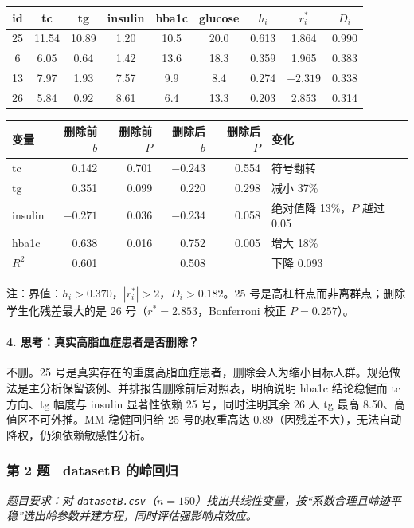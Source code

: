 \begin{tabular}{ccccccccc}
\toprule
id & tc & tg & insulin & hba1c & glucose & $h_i$ & $r_i^*$ & $D_i$\\
\midrule
25 & 11.54 & 10.89 & 1.20 & 10.5 & 20.0 & 0.613 & 1.864  & 0.990\\
6  & 6.05  & 0.64  & 1.42 & 13.6 & 18.3 & 0.359 & 1.965  & 0.383\\
13 & 7.97  & 1.93  & 7.57 & 9.9  & 8.4  & 0.274 & $-2.319$ & 0.338\\
26 & 5.84  & 0.92  & 8.61 & 6.4  & 13.3 & 0.203 & 2.853  & 0.314\\
\bottomrule
\end{tabular}

\vspace{0.8em}
\begin{tabular}{lrrrrl}
\toprule
变量 & 删除前 $b$ & 删除前 $P$ & 删除后 $b$ & 删除后 $P$ & 变化\\
\midrule
tc      & 0.142  & 0.701 & $-0.243$ & 0.554 & 符号翻转\\
tg      & 0.351  & 0.099 & 0.220  & 0.298 & 减小 37\%\\
insulin & $-0.271$ & 0.036 & $-0.234$ & 0.058 & 绝对值降 13\%，$P$ 越过 0.05\\
hba1c   & 0.638  & 0.016 & 0.752  & 0.005 & 增大 18\%\\
\midrule
$R^2$   & 0.601  &       & 0.508  &       & 下降 0.093\\
\bottomrule
\end{tabular}

\begin{studysource}
注：界值：$h_i>0.370$，$|r_i^*|>2$，$D_i>0.182$。25 号是高杠杆点而非离群点；删除学生化残差最大的是 26 号（$r^*=2.853$，Bonferroni 校正 $P=0.257$）。
\end{studysource}


\paragraph{4. 思考：真实高脂血症患者是否删除？}不删。25 号是真实存在的重度高脂血症患者，删除会人为缩小目标人群。规范做法是主分析保留该例、并排报告删除前后对照表，明确说明 hba1c 结论稳健而 tc 方向、tg 幅度与 insulin 显著性依赖 25 号，同时注明其余 26 人 tg 最高 8.50、高值区不可外推。MM 稳健回归给 25 号的权重高达 0.89（因残差不大），无法自动降权，仍须依赖敏感性分析。

\subsubsection*{第 2 题　datasetB 的岭回归}
\emph{题目要求：对 \texttt{datasetB.csv}（$n=150$）找出共线性变量，按“系数合理且岭迹平稳”选出岭参数并建方程，同时评估强影响点效应。}

